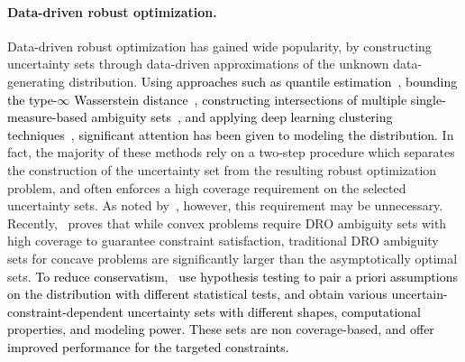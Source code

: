 \documentclass[11pt]{article}
\newcommand{\bsnote}[1]{\noindent\textcolor{red}{\texttt{Bartolomeo: #1}}}
\newcommand{\RC}[1]{\textcolor{black}{#1}}
\begin{document}
\paragraph{Data-driven robust optimization.}
Data-driven robust optimization has gained wide popularity, by constructing uncertainty sets through data-driven approximations of the unknown data-generating distribution.
\RC{Using approaches such as quantile estimation~\citep{hong2022ms}, bounding the type-$\infty$ Wasserstein distance~\citep{wassinf}, constructing intersections of multiple single-measure-based ambiguity sets~\citep{tanoumanddata}, and applying deep learning clustering techniques~\citep{GOERIGK2023106087}, significant attention has been given to modeling the distribution.} 
In fact, the majority of these methods rely on a two-step procedure which separates the construction of the uncertainty set from the resulting robust optimization problem, and often enforces a high coverage requirement on the selected uncertainty sets. 
As noted by~\cite{ben-tal_robust_2009}, however, this requirement may be unnecessary. 
Recently,~\cite{gupta} proves that while convex problems require \gls{DRO} ambiguity sets with high coverage to guarantee constraint satisfaction, traditional \gls{DRO} ambiguity sets for concave problems are significantly larger than the asymptotically optimal sets.
\RC{To reduce conservatism,~\cite{bertsimas_data-driven_2018} use hypothesis testing to pair a priori assumptions on the distribution with different statistical tests, and obtain various uncertain-constraint-dependent uncertainty sets with different shapes, computational properties, and modeling power. These sets are non coverage-based, and offer improved performance for the targeted constraints.}
\end{document}
